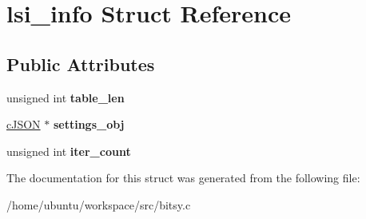 \hypertarget{structlsi__info}{\section{lsi\-\_\-info Struct Reference}
\label{structlsi__info}
}
\subsection*{Public Attributes}
\begin{DoxyCompactItemize}
\item 
\hypertarget{structlsi__info_a5c66ebbfb1526c92c68fb5ac403acf0b}{unsigned int {\bfseries table\-\_\-len}}\label{structlsi__info_a5c66ebbfb1526c92c68fb5ac403acf0b}

\item 
\hypertarget{structlsi__info_ab05615e0a85951424efe5c7590898a34}{\hyperlink{structcJSON}{c\-J\-S\-O\-N} $\ast$ {\bfseries settings\-\_\-obj}}\label{structlsi__info_ab05615e0a85951424efe5c7590898a34}

\item 
\hypertarget{structlsi__info_a154a97e557122436a68d31bd447810fa}{unsigned int {\bfseries iter\-\_\-count}}\label{structlsi__info_a154a97e557122436a68d31bd447810fa}

\end{DoxyCompactItemize}


The documentation for this struct was generated from the following file\-:\begin{DoxyCompactItemize}
\item 
/home/ubuntu/workspace/src/bitsy.\-c\end{DoxyCompactItemize}
